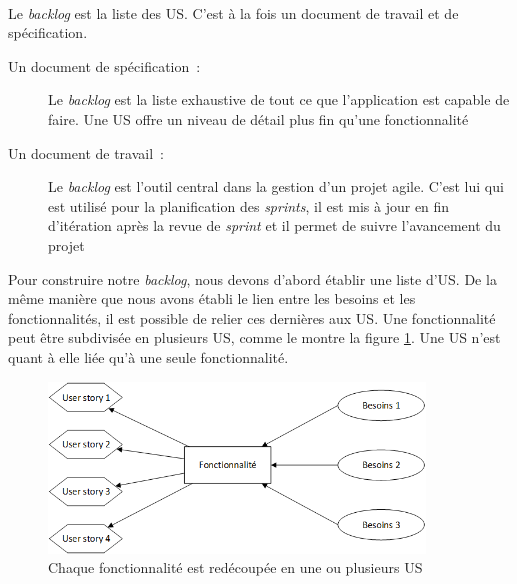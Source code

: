 			\paragraph{}%
			Le \textit{backlog} est la liste des US. C'est à la fois un document de
			travail et de spécification.
			\begin{description}
				\item[Un document de spécification~:] Le \textit{backlog} est la liste
				exhaustive de tout ce que l'application est capable de faire. Une US offre un
				niveau de détail plus fin qu'une fonctionnalité
				\item[Un document de travail~:] Le \textit{backlog} est l'outil central
				dans la gestion d'un projet agile. C'est lui qui est utilisé pour la
				planification des \textit{sprints}, il est mis à jour en fin d'itération
				après la revue de \textit{sprint} et il permet de suivre l'avancement du
				projet
			\end{description}
			Pour construire notre \textit{backlog}, nous devons d'abord établir une liste
			d'US.
			De la même manière que nous avons établi le lien entre les besoins et
			les fonctionnalités, il est possible de relier ces dernières aux US.
			Une fonctionnalité peut être subdivisée en plusieurs US, comme le
			montre la figure \ref{mapping_fonctios_us}. Une US n'est quant à elle
			liée qu'à une seule fonctionnalité.
			\begin{figure}[H]%
				\centering
				\includegraphics[width=10cm]{../img/part3/mapping_fonctios_us.png}
				\caption{\label{mapping_fonctios_us} Chaque fonctionnalité est redécoupée
				en une ou plusieurs US}
			\end{figure}
			
